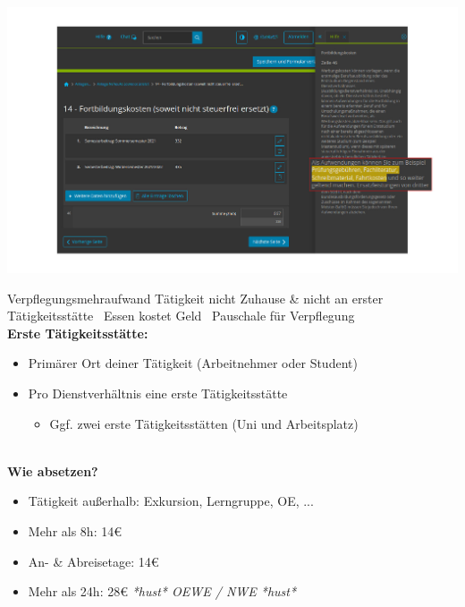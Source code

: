 \documentclass{beamer}
\newcommand{\n}{\hfill\\\vspace{0.25cm}}
\begin{document}
			\begin{frame}
				\begin{center}
					\vspace{-0.6cm}
					\hspace*{-0.91cm}
					\includegraphics[scale=0.24]{images/elster-fortbildungskosten-3}
				\end{center}
			\end{frame}
		
			\begin{frame}{Verpflegungsmehraufwand}
				Tätigkeit nicht Zuhause \& nicht an erster Tätigkeitsstätte \textrightarrow\ Essen kostet Geld \textrightarrow\ Pauschale für Verpflegung\n
				\textbf{Erste Tätigkeitsstätte:}
				\begin{itemize}
					\item Primärer Ort deiner Tätigkeit (Arbeitnehmer oder Student)
					\item Pro Dienstverhältnis eine erste Tätigkeitsstätte
					\begin{itemize}
						\item Ggf. zwei erste Tätigkeitsstätten (Uni und Arbeitsplatz)
					\end{itemize}
				\end{itemize}\n
				\textbf{Wie absetzen?}
				\begin{itemize}
					\item Tätigkeit außerhalb: Exkursion, Lerngruppe, OE, ...
					\item Mehr als 8h: 14€
					\item An- \& Abreisetage: 14€
					\item Mehr als 24h: 28€ {\tiny \textit{*hust* OEWE / NWE *hust*}}
				\end{itemize}
			\end{frame}
		
\end{document}
